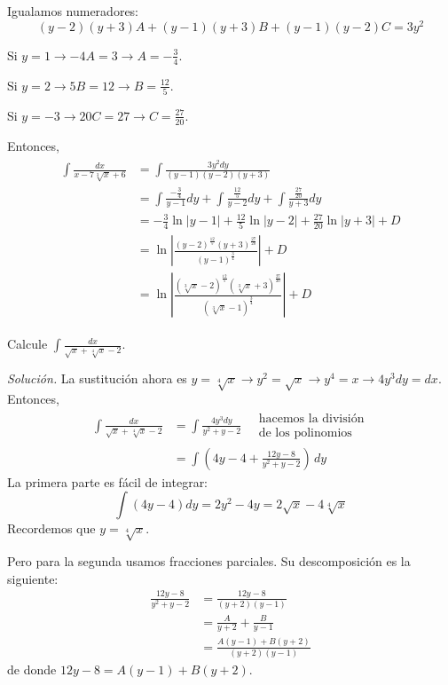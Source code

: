 Igualamos numeradores:
\[
  \left( y-2\right) \left( y+3\right) A+\left( y-1\right) \left( y+3\right)
  B+\left( y-1\right) \left( y-2\right) C=3y^{2}
\]

\clearpage

Si $y=1 \rightarrow -4A=3\rightarrow A=-\frac{3}{4}$.

Si $y=2\rightarrow 5B=12\rightarrow B=\frac{12}{5}$.

Si $y=-3\rightarrow 20C=27\rightarrow C=\frac{27}{20}$.

Entonces,
\begin{gather*}
  \begin{aligned}
    \int \frac{dx}{x-7\sqrt[3]{x}+6}&=\int \frac{3y^{2}dy}{\left( y-1\right) \left( y-2\right) \left( y+3\right) }\\
    &=\int \frac{-\frac{3}{4}}{y-1}dy+\int \frac{\frac{12}{5}}{y-2}dy+\int \frac{\frac{27}{20}}{y+3}dy \\
    &=-\frac{3}{4}\ln \left\vert y-1\right\vert +\frac{12}{5}%
    \ln \left\vert y-2\right\vert +\frac{27}{20}\ln \left\vert y+3\right\vert+D\\
    &=\ln \left\vert \frac{\left( y-2\right)^{\frac{12}{5}}\left( y+3\right) ^{
    \frac{27}{20}}}{\left( y-1\right) ^{\frac{3}{4}}}\right\vert +D\\
    &=\ln \left\vert \frac{\left( \sqrt[3]{x}-2\right)^{\frac{12}{5}}\left(\sqrt[3]{x}+3\right)^{\frac{27}{20}}}{\left(\sqrt[3]{x}-1\right) ^{\frac{3}{4}}}\right\vert +D
  \end{aligned}
\end{gather*}

\begin{ejemplo}
  Calcule $\int \frac{dx}{\sqrt{x}+\sqrt[4]{x}-2}$.
\end{ejemplo}
\emph{Solución.} La sustitución ahora es $y=\sqrt[4]{x}\rightarrow y^{2}=\sqrt{x}\rightarrow y^{4}=x\rightarrow 4y^{3}dy=dx$. Entonces,
\begin{align*}
  \int \frac{dx}{\sqrt{x}+\sqrt[4]{x}-2}&=\int \frac{4y^{3}dy}{y^{2}+y-2}\quad \substack{\text{hacemos la división}\\\text{de los polinomios}} \\
  &=\int\left( 4y-4+\frac{12y-8}{y^{2}+y-2}\right)\, dy
\end{align*}
La primera parte es fácil de integrar:
\[
  \int (4y-4) dy=2y^{2}-4y=2\sqrt{x}-4\sqrt[4]{x}
\]
Recordemos que $y=\sqrt[4]{x}$.

Pero para la segunda usamos fracciones parciales. Su descomposición es la siguiente:
\begin{align*}
  \frac{12y-8}{y^{2}+y-2}&=\frac{12y-8}{\left( y+2\right) \left( y-1\right) } \\
  &=\frac{A}{y+2}+\frac{B}{y-1}\\
  &=\frac{A\left( y-1\right) +B\left( y+2\right) }{\left( y+2\right) \left( y-1\right) }
\end{align*}
de donde $12y-8=A\left( y-1\right) +B\left( y+2\right)$.

